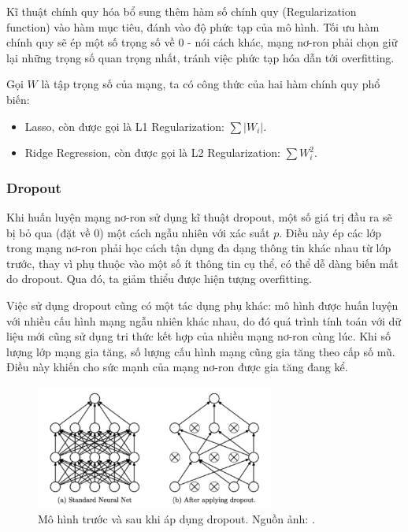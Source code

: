 \documentclass[12pt]{extreport}
\begin{document}
Kĩ thuật chính quy hóa bổ sung thêm hàm số chính quy (Regularization function) vào hàm mục tiêu, đánh vào độ phức tạp của mô hình. Tối ưu hàm chính quy sẽ ép một số trọng số về 0 - nói cách khác, mạng nơ-ron phải chọn giữ lại những trọng số quan trọng nhất, tránh việc phức tạp hóa dẫn tới overfitting.

Gọi $ W $ là tập trọng số của mạng, ta có công thức của hai hàm chính quy phổ biến:

\begin{itemize}
    \item Lasso, còn được gọi là L1 Regularization: $ \sum |W_i| $.
    \item Ridge Regression, còn được gọi là L2 Regularization: $ \sum W_i^2 $.
\end{itemize}

\subsubsection{Dropout}

Khi huấn luyện mạng nơ-ron sử dụng kĩ thuật dropout, một số giá trị đầu ra sẽ bị bỏ qua (đặt về 0) một cách ngẫu nhiên với xác suất $ p $. Điều này ép các lớp trong mạng nơ-ron phải học cách tận dụng đa dạng thông tin khác nhau từ lớp trước, thay vì phụ thuộc vào một số ít thông tin cụ thể, có thể dễ dàng biến mất do dropout. Qua đó, ta giảm thiểu được hiện tượng overfitting.

Việc sử dụng dropout cũng có một tác dụng phụ khác: mô hình được huấn luyện với nhiều cấu hình mạng ngẫu nhiên khác nhau, do đó quá trình tính toán với dữ liệu mới cũng sử dụng tri thức kết hợp của nhiều mạng nơ-ron cùng lúc. Khi số lượng lớp mạng gia tăng, số lượng cấu hình mạng cũng gia tăng theo cấp số mũ. Điều này khiến cho sức mạnh của mạng nơ-ron được gia tăng đang kể.

\begin{figure}[H]
    \centering
    \includegraphics[width=0.7\textwidth]{figure3}
    \caption{Mô hình trước và sau khi áp dụng dropout. Nguồn ảnh: \cite{JMLR:v15:srivastava14a}.}
\end{figure}
\end{document}
